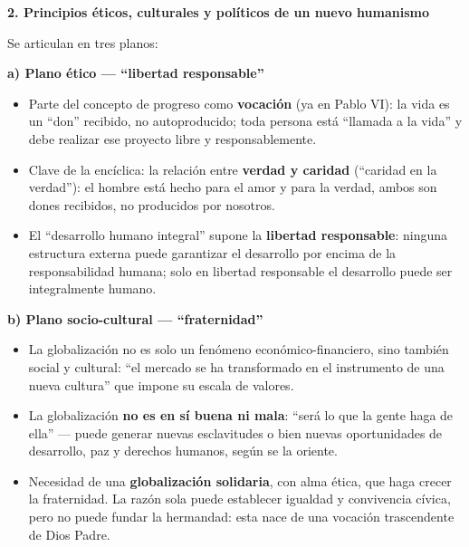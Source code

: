 \documentclass[10pt,a4paper]{article}
\begin{document}
\medskip\noindent \textbf{2. Principios éticos, culturales y políticos de un nuevo humanismo}\par\nopagebreak
\noindent Se articulan en tres planos:\par\smallskip

\medskip\noindent \textbf{a) Plano ético --- ``libertad responsable''}\par\nopagebreak
\begin{itemize}
\item Parte del concepto de progreso como \textbf{vocación} (ya en Pablo VI): la vida es un ``don'' recibido, no autoproducido; toda persona está ``llamada a la vida'' y debe realizar ese proyecto libre y responsablemente.
\item Clave de la encíclica: la relación entre \textbf{verdad y caridad} (``caridad en la verdad''): el hombre está hecho para el amor y para la verdad, ambos son dones recibidos, no producidos por nosotros.
\item El ``desarrollo humano integral'' supone la \textbf{libertad responsable}: ninguna estructura externa puede garantizar el desarrollo por encima de la responsabilidad humana; solo en libertad responsable el desarrollo puede ser integralmente humano.
\end{itemize}

\medskip\noindent \textbf{b) Plano socio-cultural --- ``fraternidad''}\par\nopagebreak
\begin{itemize}
\item La globalización no es solo un fenómeno económico-financiero, sino también social y cultural: ``el mercado se ha transformado en el instrumento de una nueva cultura'' que impone su escala de valores.
\item La globalización \textbf{no es en sí buena ni mala}: ``será lo que la gente haga de ella'' --- puede generar nuevas esclavitudes o bien nuevas oportunidades de desarrollo, paz y derechos humanos, según se la oriente.
\item Necesidad de una \textbf{globalización solidaria}, con alma ética, que haga crecer la fraternidad. La razón sola puede establecer igualdad y convivencia cívica, pero no puede fundar la hermandad: esta nace de una vocación trascendente de Dios Padre.
\end{itemize}
\end{document}
